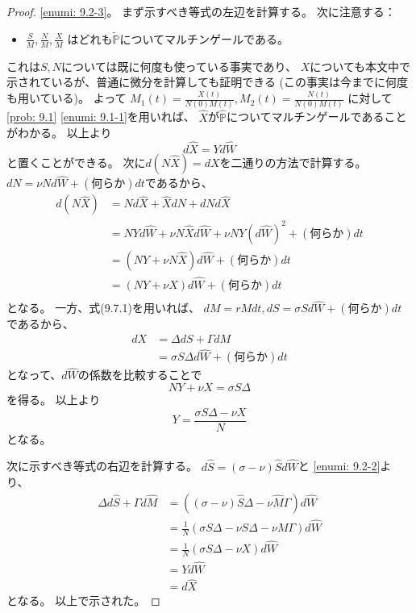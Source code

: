 \documentclass[uplatex]{jsarticle}
\theoremstyle{definition}
\def\P{\mathbb{P}}
\begin{document}
\begin{proof}
  \ref{enumi: 9.2-3}。
  まず示すべき等式の左辺を計算する。
  次に注意する：
  \begin{itemize}
    \item
    \(\frac{S}{M},\frac{N}{M},\frac{X}{M}\)
    はどれも\(\tilde{\P}\)についてマルチンゲールである。
  \end{itemize}
  これは\(S,N\)については既に何度も使っている事実であり、
  \(X\)についても本文中で示されているが、普通に微分を計算しても証明できる
  (この事実は今までに何度も用いている)。
  よって
  \(M_1(t) = \frac{X(t)}{N(0)M(t)}, M_2(t) = \frac{N(t)}{N(0)M(t)}\)
  に対して\autoref{prob: 9.1} \ref{enumi: 9.1-1}を用いれば、
  \(\hat{X}\)が\(\hat{\P}\)についてマルチンゲールであることがわかる。
  以上より
  \[
  d\hat{X} = Yd\hat{W}
  \]
  と置くことができる。
  次に\(d\left( N\hat{X}\right) = dX\)を二通りの方法で計算する。
  \(dN = \nu N d\hat{W} + (\text{何らか})dt\)であるから、
  \begin{align*}
    d\left( N\hat{X}\right)
    &= Nd\hat{X} + \hat{X}dN + dNd\hat{X} \\
    &= NYd\hat{W} + \nu N\hat{X}d\hat{W}
    + \nu N Y\left( d\hat{W}\right)^2 + (\text{何らか})dt \\
    &= \left( NY + \nu N\hat{X} \right) d\hat{W}
    + (\text{何らか})dt \\
    &= \left( NY + \nu X \right) d\hat{W}
    + (\text{何らか})dt \\
  \end{align*}
  となる。
  一方、式(9.7.1)を用いれば、
  \(dM = rMdt, dS = \sigma S d\hat{W} + (\text{何らか})dt\)であるから、
  \begin{align*}
    dX &= \Delta dS + \Gamma dM \\
    &= \sigma S \Delta d\hat{W} + (\text{何らか})dt
  \end{align*}
  となって、\(d\hat{W}\)の係数を比較することで
  \[
  NY + \nu X = \sigma S \Delta
  \]
  を得る。
  以上より
  \[
  Y = \frac{\sigma S \Delta - \nu X}{N}
  \]
  となる。

  次に示すべき等式の右辺を計算する。
  \(d\hat{S} = (\sigma - \nu)\hat{S}d\hat{W}\)と
  \ref{enumi: 9.2-2}より、
  \begin{align*}
    \Delta d\hat{S} + \Gamma d\hat{M}
    &= \left( (\sigma - \nu)\hat{S}\Delta - \nu\hat{M}\Gamma \right) d\hat{W} \\
    &= \frac{1}{N}\left( \sigma S\Delta - \nu S\Delta
    - \nu M \Gamma \right) d\hat{W} \\
    &= \frac{1}{N}\left( \sigma S\Delta - \nu X \right) d\hat{W} \\
    &= Yd\hat{W} \\
    &= d\hat{X}
  \end{align*}
  となる。
  以上で示された。
\end{proof}
\end{document}
